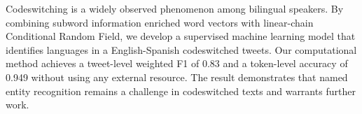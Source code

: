 Codeswitching is a widely observed phenomenon among bilingual speakers. By combining subword information enriched word vectors with linear-chain Conditional Random Field, we develop a supervised machine learning model that identifies languages in a English-Spanish codeswitched tweets. Our computational method achieves a tweet-level weighted F1 of 0.83 and a token-level accuracy of 0.949 without using any external resource. The result demonstrates that named entity recognition remains a challenge in codeswitched texts and warrants further work.
